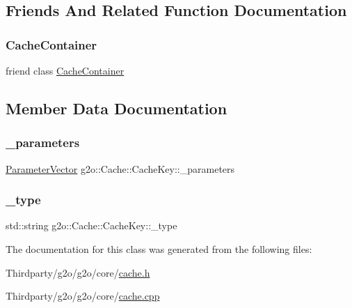 \subsection{Friends And Related Function Documentation}
\mbox{\label{classg2o_1_1_cache_1_1_cache_key_a86dec1e0424aa4ae4e6867c69efd7868}} 
\subsubsection{\texorpdfstring{Cache\+Container}{CacheContainer}}
{\footnotesize\ttfamily friend class \mbox{\hyperlink{classg2o_1_1_cache_container}{Cache\+Container}}\hspace{0.3cm}{\ttfamily [friend]}}



\subsection{Member Data Documentation}
\mbox{\label{classg2o_1_1_cache_1_1_cache_key_a3f8dc2307bd1d174a30bdc8443a8d152}} 
\subsubsection{\texorpdfstring{\+\_\+parameters}{\_parameters}}
{\footnotesize\ttfamily \mbox{\hyperlink{namespaceg2o_a85cc8f2c7db8cab47b2b269a7acd6785}{Parameter\+Vector}} g2o\+::\+Cache\+::\+Cache\+Key\+::\+\_\+parameters\hspace{0.3cm}{\ttfamily [protected]}}

\mbox{\label{classg2o_1_1_cache_1_1_cache_key_a886ec6cf583561cb791cbaff902c673d}} 
\subsubsection{\texorpdfstring{\+\_\+type}{\_type}}
{\footnotesize\ttfamily std\+::string g2o\+::\+Cache\+::\+Cache\+Key\+::\+\_\+type\hspace{0.3cm}{\ttfamily [protected]}}



The documentation for this class was generated from the following files\+:\begin{DoxyCompactItemize}
\item 
Thirdparty/g2o/g2o/core/\mbox{\hyperlink{cache_8h}{cache.\+h}}\item 
Thirdparty/g2o/g2o/core/\mbox{\hyperlink{cache_8cpp}{cache.\+cpp}}\end{DoxyCompactItemize}
